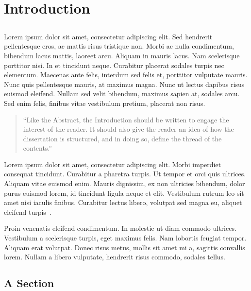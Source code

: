 \chapter{Introduction} \label{chap:intro}

\section*{}

Lorem ipsum dolor sit amet, consectetur adipiscing elit. Sed hendrerit
pellentesque eros, ac mattis risus tristique non. Morbi ac nulla
condimentum, bibendum lacus mattis, laoreet arcu. Aliquam in mauris
lacus. Nam scelerisque porttitor nisi. In et tincidunt
neque. Curabitur placerat sodales turpis nec elementum. Maecenas ante
felis, interdum sed felis et, porttitor vulputate mauris. Nunc quis
pellentesque mauris, at maximus magna. Nunc ut lectus dapibus risus
euismod eleifend. Nullam sed velit bibendum, maximus sapien at,
sodales arcu. Sed enim felis, finibus vitae vestibulum pretium,
placerat non risus. 

\begin{quote}
  ``Like the Abstract, the Introduction should be written to engage the
  interest of the reader. It should also give the reader an idea of
  how the dissertation is structured, and in doing so, define the
  thread of the contents.''~\cite[chap.\ Introduction]{kn:Tha01} 
\end{quote}

Lorem ipsum dolor sit amet, consectetur adipiscing elit. Morbi
imperdiet consequat tincidunt. Curabitur a pharetra turpis. Ut tempor
et orci quis ultrices. Aliquam vitae euismod enim. Mauris dignissim,
ex non ultricies bibendum, dolor purus euismod lorem, id tincidunt
ligula neque et elit. Vestibulum rutrum leo sit amet nisi iaculis
finibus. Curabitur lectus libero, volutpat sed magna eu, aliquet
eleifend turpis~\cite{kn:Tha01,kn:PP05}.

Proin venenatis eleifend condimentum. In molestie ut diam commodo
ultrices. Vestibulum a scelerisque turpis, eget maximus felis. Nam
lobortis feugiat tempor. Aliquam erat volutpat. Donec risus metus,
mollis sit amet mi a, sagittis convallis lorem. Nullam a libero
vulputate, hendrerit risus commodo, sodales tellus. 

\section{A Section} \label{sec:context}

